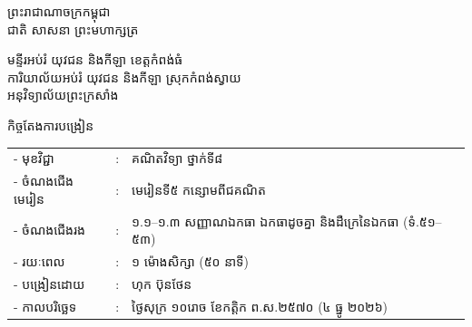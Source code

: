 \documentclass[a4paper,10pt]{article}
\newcommand{\khmflourish}{{\Tacteing\fontsize{36pt}{14pt}\selectfont\raisebox{-5pt}{3}}}
\begin{document}
\fontsize{10pt}{15.2pt}\selectfont

\begin{center}
  {\muol\fontsize{11pt}{16pt}\selectfont ព្រះរាជាណាចក្រកម្ពុជា}\\[2pt]
  {\muol\fontsize{10pt}{15pt}\selectfont ជាតិ សាសនា ព្រះមហាក្សត្រ}\\[1pt]
  \khmflourish
\end{center}

\vspace{-28pt}
{\muol\fontsize{9.5pt}{12.5pt}\selectfont
មន្ទីរអប់រំ យុវជន និងកីឡា ខេត្តកំពង់ធំ\\
ការិយាល័យអប់រំ យុវជន និងកីឡា ស្រុកកំពង់ស្វាយ\\
អនុវិទ្យាល័យព្រះក្រសាំង}

\vspace{1pt}
\begin{center}
  {\muol\fontsize{10pt}{14pt}\selectfont កិច្ចតែងការបង្រៀន}
\end{center}
\vspace{0pt}

{\renewcommand{\arraystretch}{0.95}
\hspace*{4.05cm}%
\begin{tabular}{@{}l l l@{}}
  - \hspace{0.35cm} មុខវិជ្ជា & : & គណិតវិទ្យា ថ្នាក់ទី៨ \\
  - \hspace{0.35cm} ចំណងជើងមេរៀន & : & មេរៀនទី៥ កន្សោមពីជគណិត \\
  - \hspace{0.35cm} ចំណងជើងរង & : & ១.១--១.៣ សញ្ញាណឯកធា ឯកធាដូចគ្នា និងដឺក្រេនៃឯកធា (ទំ.៥១--៥៣) \\
  - \hspace{0.35cm} រយៈពេល & : & ១ ម៉ោងសិក្សា (៥០ នាទី) \\
  - \hspace{0.35cm} បង្រៀនដោយ & : & ហុក ប៊ុនថែន \\
  - \hspace{0.35cm} កាលបរិច្ឆេទ & : & ថ្ងៃសុក្រ ១០រោច ខែកត្តិក ព.ស.២៥៧០ (៤ ធ្នូ ២០២៦) \\
\end{tabular}
}

\vspace{1pt}
\end{document}
